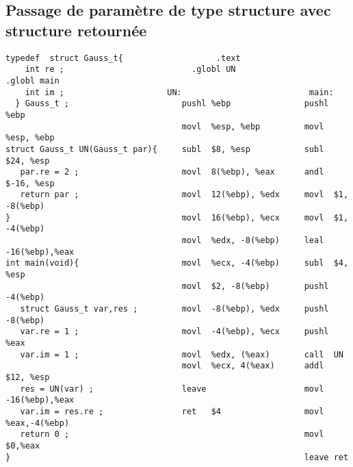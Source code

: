 \begin{frame}
  \section{Passage de param\`etre de type structure avec structure retourn\'ee}%
\begin{verbatim}
typedef  struct Gauss_t{                   .text                 
    int re ;                          .globl UN                      .globl main   
    int im ;                     UN:                          main:           
  } Gauss_t ;                       pushl %ebp               pushl %ebp            
                                    movl  %esp, %ebp         movl  %esp, %ebp  
struct Gauss_t UN(Gauss_t par){     subl  $8, %esp           subl  $24, %esp   
   par.re = 2 ;                     movl  8(%ebp), %eax      andl  $-16, %esp  
   return par ;                     movl  12(%ebp), %edx     movl  $1, -8(%ebp)
}                                   movl  16(%ebp), %ecx     movl  $1, -4(%ebp)
                                    movl  %edx, -8(%ebp)     leal  -16(%ebp),%eax       
int main(void){                     movl  %ecx, -4(%ebp)     subl  $4, %esp    
                                    movl  $2, -8(%ebp)       pushl -4(%ebp)    
   struct Gauss_t var,res ;         movl  -8(%ebp), %edx     pushl -8(%ebp)    
   var.re = 1 ;                     movl  -4(%ebp), %ecx     pushl %eax               
   var.im = 1 ;                     movl  %edx, (%eax)       call  UN                                            
                                    movl  %ecx, 4(%eax)      addl  $12, %esp   
   res = UN(var) ;                  leave                    movl -16(%ebp),%eax
   var.im = res.re ;                ret   $4                 movl %eax,-4(%ebp)
   return 0 ;                                                movl  $0,%eax
}                                                            leave ret
 \end{verbatim}
\end{frame}

\begin{frame}
  \section{}%
\end{frame}
